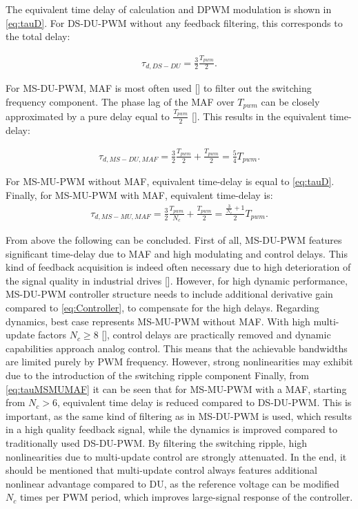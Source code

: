 \documentclass[journal]{IEEEtran}
\begin{document}
The equivalent time delay of calculation and DPWM modulation is shown in \eqref{eq:tauD}. For DS-DU-PWM without any feedback filtering, this corresponds to the total delay:

\begin{equation}
\begin{aligned}
\tau_{d,DS-DU} = \frac{3}{2} \frac{T_{pwm}}{2}.
\label{eq:tauDSDU} 
\end{aligned}    
\end{equation}

For MS-DU-PWM, MAF is most often used [] to filter out the switching frequency component. The phase lag of the MAF over $T_{pwm}$ can be closely approximated by a pure delay equal to $\frac{T_{pwm}}{2}$ []. This results in the equivalent time-delay:

\begin{equation}
\begin{aligned}
\tau_{d,MS-DU,MAF} = \frac{3}{2} \frac{T_{pwm}}{2} + \frac{T_{pwm}}{2} = \frac{5}{4} T_{pwm}.
\label{eq:tauMSDU} 
\end{aligned}    
\end{equation}

For MS-MU-PWM without MAF, equivalent time-delay is equal to \eqref{eq:tauD}.
Finally, for MS-MU-PWM with MAF, equivalent time-delay is:
\begin{equation}
\begin{aligned}
\tau_{d,MS-MU,MAF} = \frac{3}{2} \frac{T_{pwm}}{N_c} + \frac{T_{pwm}}{2} = \frac{\frac{3}{N_c}+1}{2}T_{pwm}.
\label{eq:tauMSMUMAF} 
\end{aligned}    
\end{equation}

From above the following can be concluded. First of all, MS-DU-PWM features significant time-delay due to MAF and high modulating and control delays. This kind of feedback acquisition is indeed often necessary due to high deterioration of the signal quality in industrial drives []. However, for high dynamic performance, MS-DU-PWM controller structure needs to include additional derivative gain compared to \eqref{eq:Controller}, to compensate for the high delays. Regarding dynamics, best case represents MS-MU-PWM without MAF. With high multi-update factors $N_c \geq 8$ [], control delays are practically removed and dynamic capabilities approach analog control. This means that the achievable bandwidths are limited purely by PWM frequency. However, strong nonlinearities may exhibit due to the introduction of the switching ripple component 
Finally, from \eqref{eq:tauMSMUMAF} it can be seen that for MS-MU-PWM with a MAF, starting from $N_c>6$, equivalent time delay is reduced compared to DS-DU-PWM. This is important, as the same kind of filtering as in MS-DU-PWM is used, which results in a high quality feedback signal, while the dynamics is improved compared to traditionally used DS-DU-PWM. By filtering the switching ripple, high nonlinearities due to multi-update control are strongly attenuated. 
In the end, it should be mentioned that multi-update control always features additional nonlinear advantage compared to DU, as the reference voltage can be modified $N_c$ times per PWM period, which improves large-signal response of the controller. 
\end{document}
